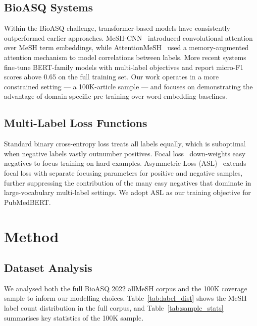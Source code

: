 \documentclass[sigconf]{acmart}
\begin{document}
\subsection{BioASQ Systems}

Within the BioASQ challenge, transformer-based models have consistently outperformed earlier
approaches. MeSH-CNN~\cite{meshcnn} introduced convolutional attention over MeSH term embeddings,
while AttentionMeSH~\cite{attentionmesh} used a memory-augmented attention mechanism to model
correlations between labels. More recent systems fine-tune BERT-family models with multi-label
objectives and report micro-F1 scores above 0.65 on the full training set. Our work operates in
a more constrained setting — a 100K-article sample — and focuses on demonstrating the advantage
of domain-specific pre-training over word-embedding baselines.

\subsection{Multi-Label Loss Functions}

Standard binary cross-entropy loss treats all labels equally, which is suboptimal when negative
labels vastly outnumber positives. Focal loss~\cite{lin2017focal} down-weights easy negatives to
focus training on hard examples. Asymmetric Loss (ASL)~\cite{ridnik2021asl} extends focal loss
with separate focusing parameters for positive and negative samples, further suppressing the
contribution of the many easy negatives that dominate in large-vocabulary multi-label settings.
We adopt ASL as our training objective for PubMedBERT.

\section{Method}
\label{sec:method}

\subsection{Dataset Analysis}
\label{sec:analysis}

We analysed both the full BioASQ 2022 allMeSH corpus and the 100K coverage sample to inform
our modelling choices. Table~\ref{tab:label_dist} shows the MeSH label count distribution in
the full corpus, and Table~\ref{tab:sample_stats} summarises key statistics of the 100K sample.
\end{document}
